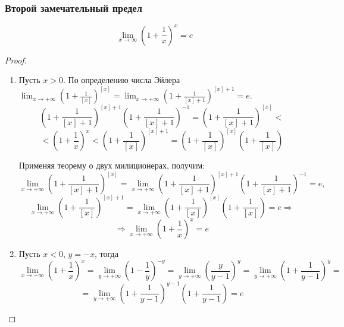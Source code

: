 \subsubsection{Второй замечательный предел}
\begin{statement}
\begin{equation*}
\lim_{x \to \infty} \left( 1 + \frac1x \right)^x = e
\end{equation*}
\end{statement}
\begin{proof}
\begin{enumerate}
	\item Пусть $x > 0$.
	По определению числа Эйлера
	$\displaystyle \lim_{x \to +\infty} \left( 1 + \frac1{[x]} \right)^{[x]} =
	\lim_{x \to +\infty} \left( 1 + \frac1{[x] + 1} \right)^{[x] + 1} =
	e$.
	\begin{equation*}
	\left( 1 + \frac1{[x] + 1} \right)^{[x] + 1} \left( 1 + \frac1{[x] + 1} \right)^{-1} =
	\left( 1 + \frac1{[x] + 1} \right)^{[x]} <
	\end{equation*}
	\begin{equation*}
	< \left( 1 + \frac1x \right)^x <
	\left( 1 + \frac1{[x]} \right)^{[x] + 1} =
	\left( 1 + \frac1{[x]} \right)^{[x]} \left( 1 + \frac1{[x]} \right)
	\end{equation*}
	
	Применяя теорему о двух милиционерах, получим:
	\begin{equation*}
	\lim_{x \to +\infty} \left( 1 + \frac1{[x] + 1} \right)^{[x]} =
	\lim_{x \to +\infty} \left( 1 + \frac1{[x] + 1} \right)^{[x] + 1} \left( 1 + \frac1{[x] + 1} \right)^{-1} = e,
	\end{equation*}
	\begin{equation*}
	\lim_{x \to +\infty} \left( 1 + \frac1{[x]} \right)^{[x] + 1} =
	\lim_{x \to +\infty} \left( 1 + \frac1{[x]} \right)^{[x]} \left( 1 + \frac1{[x]} \right) = e \Rightarrow
	\end{equation*}
	\begin{equation*}
	\Rightarrow \lim_{x \to +\infty} \left( 1 + \frac1x \right)^x = e
	\end{equation*}
	
	\item Пусть $x < 0$, $y = -x$, тогда
	\begin{equation*}
	\lim_{x \to -\infty} \left( 1 + \frac1x \right)^x =
	\lim_{y \to +\infty} \left( 1 - \frac1y \right)^{-y} =
	\lim_{y \to +\infty} \left( \frac{y}{y - 1} \right)^y =
	\lim_{y \to +\infty} \left( 1 + \frac1{y - 1} \right)^y =
	\end{equation*}
	\begin{equation*}
	= \lim_{y \to +\infty} \left( 1 + \frac1{y - 1} \right)^{y-1} \left( 1 + \frac1{y - 1} \right) = e
	\end{equation*}
\end{enumerate}
\end{proof}

